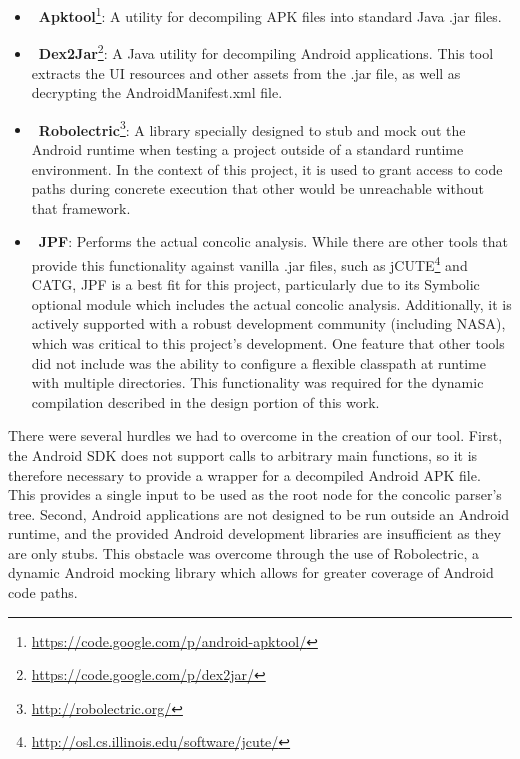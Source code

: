 \documentclass{sig-alternate-05-2015}
\begin{document}
\begin{itemize}
    \setlength{\itemsep}{0pt} %
    \setlength{\parskip}{0pt} %
    \setlength{\parsep}{0pt}  %

\item~\textbf{Apktool}\footnote{\url{https://code.google.com/p/android-apktool/}}: A utility for decompiling APK files into standard Java .jar files.

\item~\textbf{Dex2Jar}\footnote{\url{https://code.google.com/p/dex2jar/}}: A Java utility for decompiling Android applications. This tool extracts the UI resources and other assets from the .jar file, as well as decrypting the AndroidManifest.xml file.

\item~\textbf{Robolectric}\footnote{\url{http://robolectric.org/}}: A library specially designed to stub and mock out the Android runtime when testing a project outside of a standard runtime environment. In the context of this project, it is used to grant access to code paths during concrete execution that other would be unreachable without that framework.

\item~\textbf{JPF}\cite{visser2003model}: Performs the actual concolic analysis.  While there are other tools that provide this functionality against vanilla .jar files, such as jCUTE\footnote{\url{http://osl.cs.illinois.edu/software/jcute/}} and CATG, JPF is a best fit for this project, particularly due to its Symbolic optional module which includes the actual concolic analysis. Additionally, it is actively supported with a robust development community (including NASA), which was critical to this project's development. One feature that other tools did not include was the ability to configure a flexible classpath at runtime with multiple directories. This functionality was required for the dynamic compilation described in the design portion of this work.
\end{itemize}

There were several hurdles we had to overcome in the creation of our tool. First, the Android SDK does not support calls to arbitrary main functions, so it is therefore necessary to provide a wrapper for a decompiled Android APK file. This provides a single input to be used as the root node for the concolic parser's tree. Second, Android applications are not designed to be run outside an Android runtime, and the provided Android development libraries are insufficient as they are only stubs. This obstacle was overcome through the use of Robolectric, a dynamic Android mocking library which allows for greater coverage of Android code paths.
\end{document}
